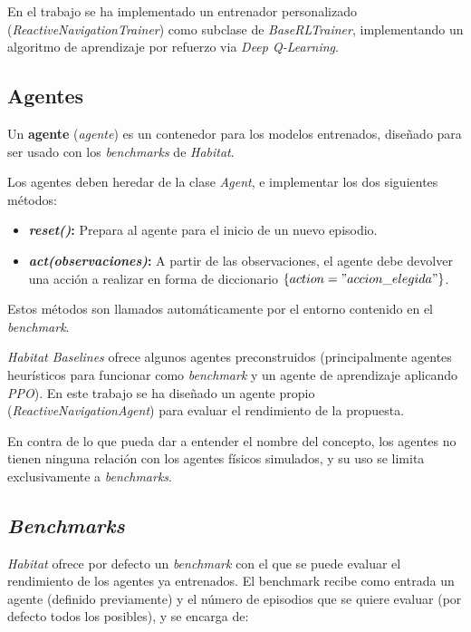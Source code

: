 En el trabajo se ha implementado un entrenador personalizado (\textit{ReactiveNavigationTrainer}) como subclase de \textit{BaseRLTrainer}, implementando un algoritmo de aprendizaje por refuerzo via \textit{Deep Q-Learning}.

\subsection{Agentes}

Un \textbf{agente} (\textit{agente}) es un contenedor para los modelos entrenados, diseñado para ser usado con los \textit{benchmarks} de \textit{Habitat}.

Los agentes deben heredar de la clase \textit{Agent}, e implementar los dos siguientes métodos:

\begin{itemize}
	\item \textbf{\textit{reset()}:} Prepara al agente para el inicio de un nuevo episodio.
	\item \textbf{\textit{act(observaciones)}:} A partir de las observaciones, el agente debe devolver una acción a realizar en forma de diccionario $\{action="accion\_elegida"\}$.
\end{itemize}

Estos métodos son llamados automáticamente por el entorno contenido en el \textit{benchmark}.

\textit{Habitat Baselines} ofrece algunos agentes preconstruidos (principalmente agentes heurísticos para funcionar como \textit{benchmark} y un agente de aprendizaje aplicando \textit{PPO}). En este trabajo se ha diseñado un agente propio (\textit{ReactiveNavigationAgent}) para evaluar el rendimiento de la propuesta.

En contra de lo que pueda dar a entender el nombre del concepto, los agentes no tienen ninguna relación con los agentes físicos simulados, y su uso se limita exclusivamente a \textit{benchmarks}.

\subsection{\textit{Benchmarks}}

\textit{Habitat} ofrece por defecto un \textit{benchmark} con el que se puede evaluar el rendimiento de los agentes ya entrenados. El benchmark recibe como entrada un agente (definido previamente) y el número de episodios que se quiere evaluar (por defecto todos los posibles), y se encarga de:

